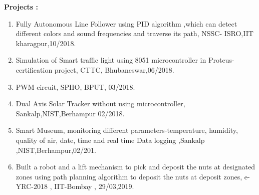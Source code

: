 \documentclass[a4]{article}
\begin{document}
\vspace{3mm}
\textbf{Projects : } 
\begin{enumerate}
	\item Fully Autonomous Line Follower using PID algorithm ,which can detect different colors and sound frequencies 
and traverse its path, NSSC- ISRO,IIT kharagpur,10/2018. 
	\item Simulation of Smart traffic light using 8051 microcontroller in Proteus-certification project, CTTC, 
Bhubaneswar,06/2018.
         \item PWM circuit, SPHO, BPUT, 03/2018. 
         \item Dual Axis Solar Tracker without using microcontroller, Sankalp,NIST,Berhampur 02/2018.
         \item Smart Museum, monitoring different parameters-temperature, humidity, quality of air, date, time and real time 
Data logging ,Sankalp ,NIST,Berhampur,02/201.
         \item Built a robot and a lift mechanism to pick and deposit the nuts at designated zones using path planning algorithm to deposit
the nuts at deposit zones, e-YRC-2018 , IIT-Bombay , 29/03,2019.
\end{enumerate}
\end{document}
